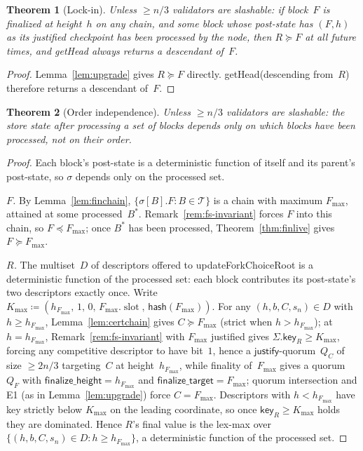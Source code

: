 \documentclass{article}
\newcommand{\T}[0]{\ensuremath{\mathcal{T}}}
\newcommand{\slot}[0]{\ensuremath{\operatorname{\mathrm{slot}}}}
\newcommand{\just}{\ensuremath{\mathsf{justify}}\xspace}
\newcommand{\finalizeHeight}{\mathsf{finalize\_height}}
\newcommand{\finalizeTarget}{\mathsf{finalize\_target}}
\newcommand{\hash}{\mathsf{hash}}
\newcommand{\key}{\mathsf{key}}
\newcommand{\updateForkChoiceRoot}{\textsf{updateForkChoiceRoot}\xspace}
\newcommand{\getHead}{\textsf{getHead}\xspace}
\theoremstyle{plain}
\newtheorem{theorem}{Theorem}
\theoremstyle{definition}
\theoremstyle{remark}
\begin{document}
\begin{theorem}[Lock-in]\label{thm:lockin}
Unless $\geq n/3$ validators are slashable: if block~$F$ is finalized at height~$h$ on any chain, and some block whose post-state has $(F, h)$ as its justified checkpoint has been processed by the node, then $R \succeq F$ at all future times, and \getHead always returns a descendant of~$F$.
\end{theorem}

\begin{proof}
Lemma~\ref{lem:upgrade} gives $R \succeq F$ directly.
\getHead (descending from~$R$) therefore returns a descendant of~$F$.
\end{proof}

\begin{theorem}[Order independence]\label{thm:orderindep}
Unless $\geq n/3$ validators are slashable: the store state after processing a set of blocks depends only on which blocks have been processed, not on their order.
\end{theorem}

\begin{proof}
Each block's post-state is a deterministic function of itself and its parent's post-state, so $\sigma$ depends only on the processed set.

\emph{$F$.} By Lemma~\ref{lem:finchain}, $\{\sigma[B].F : B \in \T\}$ is a chain with maximum $F_{\max}$, attained at some processed~$B^\ast$.
Remark~\ref{rem:fs-invariant} forces $F$ into this chain, so $F \preceq F_{\max}$; once $B^\ast$ has been processed, Theorem~\ref{thm:finlive} gives $F \succeq F_{\max}$.

\emph{$R$.} The multiset~$D$ of descriptors offered to \updateForkChoiceRoot is a deterministic function of the processed set: each block contributes its post-state's two descriptors exactly once.
Write $K_{\max} \coloneqq (h_{F_{\max}},\, 1,\, 0,\, F_{\max}.\slot,\, \hash(F_{\max}))$.
For any $(h, b, C, s_n) \in D$ with $h \geq h_{F_{\max}}$, Lemma~\ref{lem:certchain} gives $C \succeq F_{\max}$ (strict when $h > h_{F_{\max}}$); at $h = h_{F_{\max}}$, Remark~\ref{rem:fs-invariant} with $F_{\max}$ justified gives $\Sigma.\key_R \geq K_{\max}$, forcing any competitive descriptor to have bit~$1$, hence a \just-quorum~$Q_C$ of size $\geq 2n/3$ targeting~$C$ at height~$h_{F_{\max}}$, while finality of~$F_{\max}$ gives a quorum~$Q_F$ with $\finalizeHeight = h_{F_{\max}}$ and $\finalizeTarget = F_{\max}$; quorum intersection and E1 (as in Lemma~\ref{lem:upgrade}) force $C = F_{\max}$.
Descriptors with $h < h_{F_{\max}}$ have key strictly below $K_{\max}$ on the leading coordinate, so once $\key_R \geq K_{\max}$ holds they are dominated.
Hence $R$'s final value is the lex-max over $\{(h, b, C, s_n) \in D : h \geq h_{F_{\max}}\}$, a deterministic function of the processed set.
\end{proof}
\end{document}

